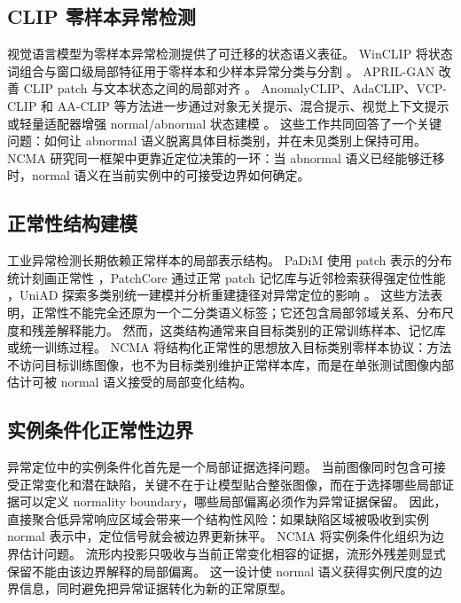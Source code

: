 \documentclass[UTF8,11pt,a4paper,fontset=none]{ctexart}
\newcommand{\method}{NCMA}
\newcommand{\clip}{CLIP}
\begin{document}
\subsection{CLIP 零样本异常检测}

视觉语言模型为零样本异常检测提供了可迁移的状态语义表征。
WinCLIP 将状态词组合与窗口级局部特征用于零样本和少样本异常分类与分割 \cite{jeong2023winclip}。
APRIL-GAN 改善 \clip{} patch 与文本状态之间的局部对齐 \cite{chen2023aprilgan}。
AnomalyCLIP、AdaCLIP、VCP-CLIP 和 AA-CLIP 等方法进一步通过对象无关提示、混合提示、视觉上下文提示或轻量适配器增强 normal/abnormal 状态建模 \cite{zhou2024anomalyclip,yao2024adaclip,qu2024vcpclip,ma2025aaclip}。
这些工作共同回答了一个关键问题：如何让 abnormal 语义脱离具体目标类别，并在未见类别上保持可用。
\method{} 研究同一框架中更靠近定位决策的一环：当 abnormal 语义已经能够迁移时，normal 语义在当前实例中的可接受边界如何确定。

\subsection{正常性结构建模}

工业异常检测长期依赖正常样本的局部表示结构。
PaDiM 使用 patch 表示的分布统计刻画正常性 \cite{defard2021padim}，PatchCore 通过正常 patch 记忆库与近邻检索获得强定位性能 \cite{roth2022patchcore}，UniAD 探索多类别统一建模并分析重建捷径对异常定位的影响 \cite{you2022uniad}。
这些方法表明，正常性不能完全还原为一个二分类语义标签；它还包含局部邻域关系、分布尺度和残差解释能力。
然而，这类结构通常来自目标类别的正常训练样本、记忆库或统一训练过程。
\method{} 将结构化正常性的思想放入目标类别零样本协议：方法不访问目标训练图像，也不为目标类别维护正常样本库，而是在单张测试图像内部估计可被 normal 语义接受的局部变化结构。

\subsection{实例条件化正常性边界}

异常定位中的实例条件化首先是一个局部证据选择问题。
当前图像同时包含可接受正常变化和潜在缺陷，关键不在于让模型贴合整张图像，而在于选择哪些局部证据可以定义 normality boundary，哪些局部偏离必须作为异常证据保留。
因此，直接聚合低异常响应区域会带来一个结构性风险：如果缺陷区域被吸收到实例 normal 表示中，定位信号就会被边界更新抹平。
\method{} 将实例条件化组织为边界估计问题。
流形内投影只吸收与当前正常变化相容的证据，流形外残差则显式保留不能由该边界解释的局部偏离。
这一设计使 normal 语义获得实例尺度的边界信息，同时避免把异常证据转化为新的正常原型。
\end{document}
